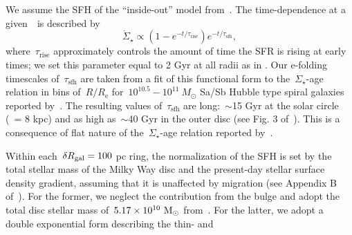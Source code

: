 \documentclass[ms.tex]{subfiles}
\begin{document}
\par
We assume the SFH of the ``inside-out'' model from~\citet{Johnson2021}.
The time-dependence at a given~\rgal~is described by
\begin{equation}
\dot{\Sigma}_\star \propto (1 - e^{-t / \tau_\text{rise}})
e^{-t/\tau_\text{sfh}},
\end{equation}
where~$\tau_\text{rise}$ approximately controls the amount of time the SFR is
rising at early times; we set this parameter equal to 2 Gyr at all radii as in
\citet{Johnson2021}.
Our e-folding timescales of~$\tau_\text{sfh}$ are taken from a fit of this
functional form to the~$\Sigma_\star$-age relation in bins of~$R / R_\text{e}$
for~$10^{10.5} - 10^{11}~M_\odot$ Sa/Sb Hubble type spiral galaxies reported
by~\citet{Sanchez2020}.
The resulting values of~$\tau_\text{sfh}$ are long:~$\sim$15 Gyr at the solar
circle (\rgal~= 8 kpc) and as high as~$\sim$40 Gyr in the outer disc (see Fig.
3 of~\citealp{Johnson2021}).
This is a consequence of flat nature of the~$\Sigma_\star$-age relation
reported by~\citet{Sanchez2020}.
\par
Within each~$\delta R_\text{gal} = 100$ pc ring, the normalization of the SFH is set by
the total stellar mass of the Milky Way disc and the present-day stellar
surface density gradient, assuming that it is unaffected by migration (see
Appendix B of~\citealp{Johnson2021}).
For the former, we neglect the contribution from the bulge and adopt the total
disc stellar mass of~$5.17\times10^{10}~\text{M}_\odot$ from~\citet{Licquia2015}.
For the latter, we adopt a double exponential form describing the thin- and
\end{document}
